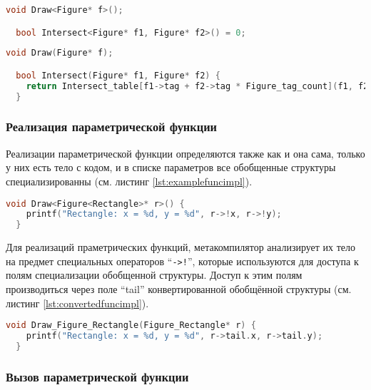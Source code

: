 \begin{lstlisting}[language=c, caption={Пример параметрической функции}, label={lst:examplefunc}]
  void Draw<Figure* f>();

  bool Intersect<Figure* f1, Figure* f2>() = 0;
\end{lstlisting}

\begin{lstlisting}[language=c, caption={Пример параметрической функции, сконвертированный в С}, label={lst:convertedfunc}]
  void Draw(Figure* f);

  bool Intersect(Figure* f1, Figure* f2) {
    return Intersect_table[f1->tag + f2->tag * Figure_tag_count](f1, f2);
  }
\end{lstlisting}

\subsubsection{Реализация параметрической функции}

Реализации параметрической функции определяются также как и она сама, только у них есть тело с кодом, и в списке параметров все обобщенные структуры специализированны (см. листинг \ref{lst:examplefuncimpl}).

\begin{lstlisting}[language=c, caption={Пример реализации параметрической функции}, label={lst:examplefuncimpl}]
  void Draw<Figure<Rectangle>* r>() {
    printf("Rectangle: x = %d, y = %d", r->!x, r->!y);
  }
\end{lstlisting}

Для реализаций праметрических функций, метакомпилятор анализирует их тело на предмет специальных операторов ``\texttt{->!}'', которые используются для доступа к полям специализации обобщенной структуры.
Доступ к этим полям производиться через поле ``tail'' конвертированной обобщённой структуры (см. листинг \ref{lst:convertedfuncimpl}).

\begin{lstlisting}[language=c, caption={Пример реализации параметрической функции, сконвертированный в С}, label={lst:convertedfuncimpl}]
  void Draw_Figure_Rectangle(Figure_Rectangle* r) {
    printf("Rectangle: x = %d, y = %d", r->tail.x, r->tail.y);
  }
\end{lstlisting}

\subsubsection{Вызов параметрической функции}

